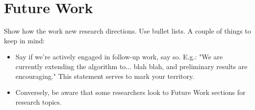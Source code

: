 \section{Future Work}

Show how the work new research directions. Use bullet lists. A couple of things to keep in mind:

\begin{itemize}
    \item Say if we're actively engaged in follow-up work, say so. E.g.: "We are currently extending the algorithm to... blah blah, and preliminary results are encouraging." This statement serves to mark your territory.

    \item Conversely, be aware that some researchers look to Future Work sections for research topics. 
\end{itemize}